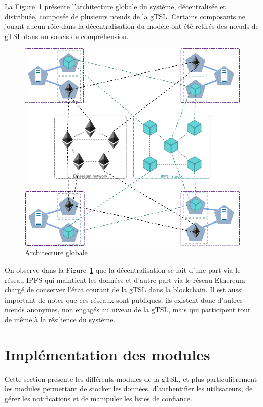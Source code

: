 \documentclass{tnreport}
\begin{document}
La Figure~\ref{fig:architecture-global} présente l'architecture globale du système, décentralisée et distribuée, composée de plusieurs nœuds de la gTSL. Certains composants ne jouant aucun rôle dans la décentralisation du modèle ont été retirés des nœuds de gTSL dans un soucis de compréhension.
\clearpage

\begin{figure}[h]
	\centering
	\includegraphics[scale=0.58]{figures/architecture-global}
	\caption{Architecture globale}
	\label{fig:architecture-global}
\end{figure}

On observe dans la Figure~\ref{fig:architecture-global} que la décentralisation se fait d'une part via le réseau IPFS qui maintient les données et d'autre part via le réseau Ethereum chargé de conserver l'état courant de la gTSL dans la blockchain. Il est aussi important de noter que ces réseaux sont publiques, ils existent donc d'autres nœuds anonymes, non engagés au niveau de la gTSL, mais qui participent tout de même à la résilience du système.

\section{Implémentation des modules}

Cette section présente les différents modules de la gTSL, et plus particulièrement les modules permettant de stocker les données, d'authentifier les utilisateurs, de gérer les notifications et de manipuler les listes de confiance.
\end{document}
